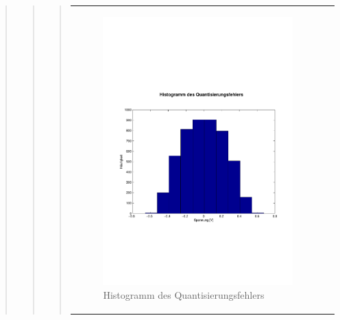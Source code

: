 \begin{quote}
\begin{quote}
\begin{quote}
\begin{center}
\begin{tabular}{ll}
                    \begin{minipage}{0.6\textwidth}
                        \begin{figure}[H]
                            \includegraphics[scale=0.4, trim = 0cm 7cm 0cm
                            7.5cm, clip]
                            {./Bilder/drei8_Histogramm}
                              \caption{Histogramm des Quantisierungsfehlers}
                        \end{figure}
                    \end{minipage}
                
                \end{tabular}
            \end{center}
            \vspace{1em}
            

\end{quote}
\end{quote}
\end{quote}
